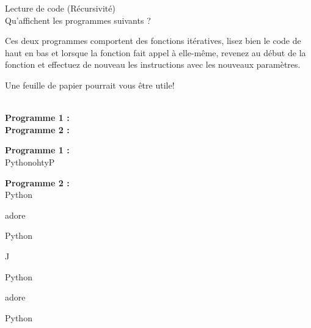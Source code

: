 \begin{Exercice}[5 minutes] Lecture de code (Récursivité)\\

Qu'affichent les programmes suivants ? \\

\begin{conseil}
   Ces deux programmes comportent des fonctions itératives, lisez bien le code de haut en bas et lorsque la fonction fait appel à elle-même, revenez au début de la fonction et effectuez de nouveau les instructions avec les nouveaux paramètres.
   
   Une feuille de papier pourrait vous être utile!\\
\end{conseil}

\textbf{\\Programme 1 :} \\

     

\textbf{Programme 2 :} \\

    

    
\begin{solution}
    \textbf{Programme 1 :} \\

    PythonohtyP
    
\end{solution}


\begin{solution}   
    \textbf{Programme 2 :} \\

    Python
    
    adore
    
    Python
    
    J
    
    Python
    
    adore
    
    Python
    
\end{solution}

\end{Exercice}

